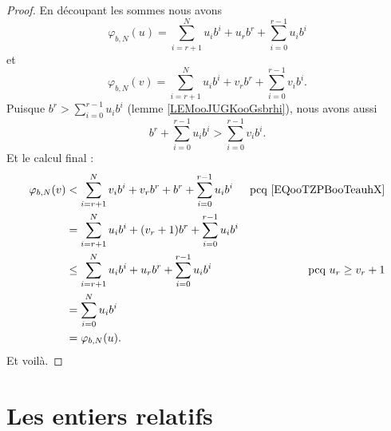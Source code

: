 \begin{proof}
	En découpant les sommes nous avons
	\begin{equation}
		\varphi_{b,N}(u)=\sum_{i=r+1}^Nu_ib^i+u_rb^r+\sum_{i=0}^{r-1}u_ib^i
	\end{equation}
	et
	\begin{equation}
		\varphi_{b,N}(v)=\sum_{i=r+1}^Nu_ib^i+v_rb^r+\sum_{i=0}^{r-1}v_ib^i.
	\end{equation}
	Puisque \( b^r>\sum_{i=0}^{r-1}u_ib^i\) (lemme \ref{LEMooJUGKooGsbrhi}), nous avons aussi
	\begin{equation}        \label{EQooTZPBooTeauhX}
		b^r+\sum_{i=0}^{r-1}u_ib^i>\sum_{i=0}^{r-1}v_ib^i.
	\end{equation}
	Et le calcul final :
	\begin{subequations}
		\begin{align}
			\varphi_{b,N}(v) & <   \sum_{i=r+1}^Nv_ib^i+v_rb^r+b^r+\sum_{i=0}^{r-1}u_ib^i & \text{pcq \eqref{EQooTZPBooTeauhX}} \\
			                 & =   \sum_{i=r+1}^Nu_ib^i+(v_r+1)b^r+\sum_{i=0}^{r-1}u_ib^i                                       \\
			                 & \leq  \sum_{i=r+1}^Nu_ib^i+u_rb^r+\sum_{i=0}^{r-1}u_ib^i   & \text{pcq } u_r\geq v_r+1           \\
			                 & =   \sum_{i=0}^Nu_ib^i                                                                           \\
			                 & =   \varphi_{b,N}(u).
		\end{align}
	\end{subequations}
	Et voilà.
\end{proof}

\section{Les entiers relatifs}
\label{SECooNombresEntiers}

